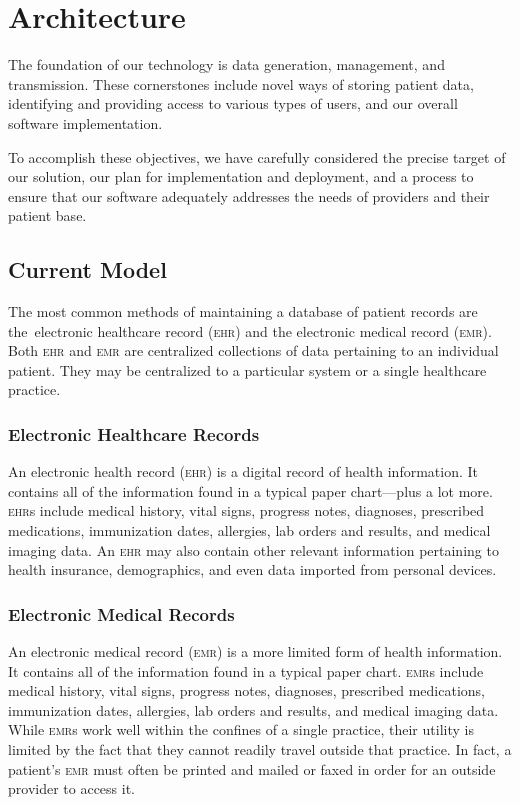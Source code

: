
\section{Architecture}
The foundation of our technology is data generation, management, and transmission. These cornerstones include novel ways of storing patient data, identifying and providing access to various types of users, and our overall software implementation.%

To accomplish these objectives, we have carefully considered the precise target of our solution, our plan for implementation and deployment, and a process to ensure that our software adequately addresses the needs of providers and their patient base.%

\subsection{Current Model}
The most common methods of maintaining a database of patient records are the electronic healthcare record (\textsc{ehr}) and the electronic medical record (\textsc{emr}). Both \textsc{ehr} and \textsc{emr} are centralized collections of data pertaining to an individual patient. They may be centralized to a particular system or a single healthcare practice.%

  \subsubsection{Electronic Healthcare Records}
  An electronic health record (\textsc{ehr}) is a digital record of health information. It contains all of the information found in a typical paper chart---plus a lot more. \textsc{ehr}s include medical history, vital signs, progress notes, diagnoses, prescribed medications, immunization dates, allergies, lab orders and results, and medical imaging data. An \textsc{ehr} may also contain other relevant information pertaining to health insurance, demographics, and even data imported from personal devices.\cite{EMRvsEHR}%

  \subsubsection{Electronic Medical Records}
  An electronic medical record (\textsc{emr}) is a more limited form of health information. It contains all of the information found in a typical paper chart. \textsc{emr}s include medical history, vital signs, progress notes, diagnoses, prescribed medications, immunization dates, allergies, lab orders and results, and medical imaging data. While \textsc{emr}s work well within the confines of a single practice, their utility is limited by the fact that they cannot readily travel outside that practice. In fact, a patient's \textsc{emr} must often be printed and mailed or faxed in order for an outside provider to access it.\cite{EMRvsEHR}%


